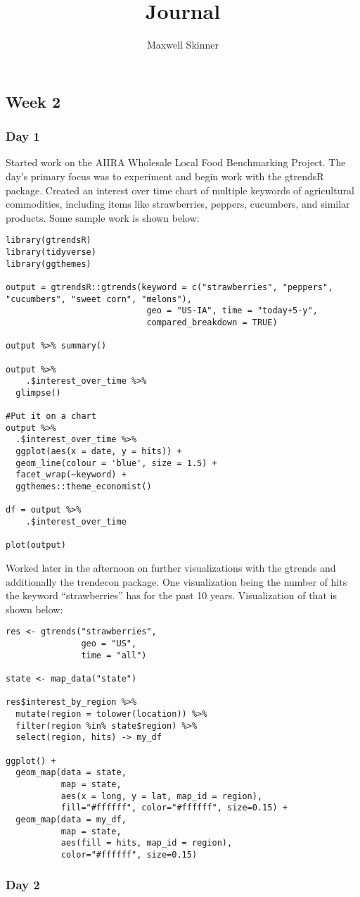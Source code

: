 \documentclass[
]{article}
\title{Journal}
\author{Maxwell Skinner}
\date{}
\begin{document}
\maketitle

\hypertarget{week-2}{%
\subsection{Week 2}\label{week-2}}

\hypertarget{day-1}{%
\subsubsection{Day 1}\label{day-1}}

Started work on the AIIRA Wholesale Local Food Benchmarking Project. The
day's primary focus was to experiment and begin work with the gtrendsR
package. Created an interest over time chart of multiple keywords of
agricultural commodities, including items like strawberries, peppers,
cucumbers, and similar products. Some sample work is shown below:

\begin{verbatim}
library(gtrendsR)
library(tidyverse)
library(ggthemes)

output = gtrendsR::gtrends(keyword = c("strawberries", "peppers", "cucumbers", "sweet corn", "melons"), 
                            geo = "US-IA", time = "today+5-y", 
                            compared_breakdown = TRUE)

output %>% summary()

output %>%
    .$interest_over_time %>%
  glimpse()

#Put it on a chart
output %>%
  .$interest_over_time %>%
  ggplot(aes(x = date, y = hits)) + 
  geom_line(colour = 'blue', size = 1.5) + 
  facet_wrap(~keyword) + 
  ggthemes::theme_economist()

df = output %>%
    .$interest_over_time

plot(output)
\end{verbatim}

Worked later in the afternoon on further visualizations with the gtrends
and additionally the trendecon package. One visualization being the
number of hits the keyword ``strawberries'' has for the past 10 years.
Visualization of that is shown below:

\begin{verbatim}
res <- gtrends("strawberries",
               geo = "US",
               time = "all")

state <- map_data("state")

res$interest_by_region %>%
  mutate(region = tolower(location)) %>%
  filter(region %in% state$region) %>%
  select(region, hits) -> my_df

ggplot() +
  geom_map(data = state,
           map = state,
           aes(x = long, y = lat, map_id = region),
           fill="#ffffff", color="#ffffff", size=0.15) +
  geom_map(data = my_df,
           map = state,
           aes(fill = hits, map_id = region),
           color="#ffffff", size=0.15)
\end{verbatim}

\hypertarget{day-2}{%
\subsubsection{Day 2}\label{day-2}}
\end{document}
